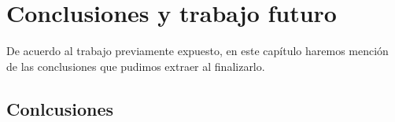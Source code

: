 \chapter{Conclusiones y trabajo futuro} \par
De acuerdo al trabajo previamente expuesto, en este capítulo haremos mención de las conclusiones que pudimos extraer al finalizarlo. \par
\section{Conlcusiones} \par 


